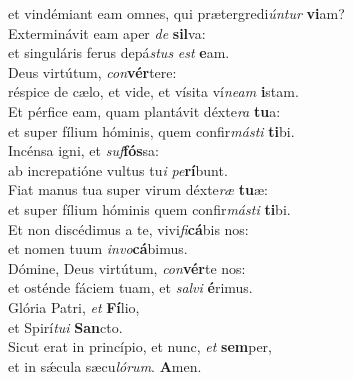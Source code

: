 \oddverse et vindémiant eam omnes, qui prætergredi\textit{ún}\textit{tur} \textbf{vi}am?\\
\evenverse Exterminávit eam aper \textit{de} \textbf{sil}va:~\*\\
\evenverse et singuláris ferus depá\textit{stus} \textit{est} \textbf{e}am.\\
\oddverse Deus virtútum, \textit{con}\textbf{vér}tere:~\*\\
\oddverse réspice de cælo, et vide, et vísita ví\textit{ne}\textit{am} \textbf{i}stam.\\
\evenverse Et pérfice eam, quam plantávit déxte\textit{ra} \textbf{tu}a:~\*\\
\evenverse et super fílium hóminis, quem confir\textit{má}\textit{sti} \textbf{ti}bi.\\
\oddverse Incénsa igni, et \textit{suf}\textbf{fós}sa:~\*\\
\oddverse ab increpatióne vultus tu\textit{i} \textit{pe}\textbf{rí}bunt.\\
\evenverse Fiat manus tua super virum déxte\textit{ræ} \textbf{tu}æ:~\*\\
\evenverse et super fílium hóminis quem confir\textit{má}\textit{sti} \textbf{ti}bi.\\
\oddverse Et non discédimus a te, vivi\textit{fi}\textbf{cá}bis nos:~\*\\
\oddverse et nomen tuum \textit{in}\textit{vo}\textbf{cá}bimus.\\
\evenverse Dómine, Deus virtútum, \textit{con}\textbf{vér}te nos:~\*\\
\evenverse et osténde fáciem tuam, et \textit{sal}\textit{vi} \textbf{é}rimus.\\
\oddverse Glória Patri, \textit{et} \textbf{Fí}lio,~\*\\
\oddverse et Spirí\textit{tu}\textit{i} \textbf{San}cto.\\
\evenverse Sicut erat in princípio, et nunc, \textit{et} \textbf{sem}per,~\*\\
\evenverse et in sǽcula sæcu\textit{ló}\textit{rum}. \textbf{A}men.\\
